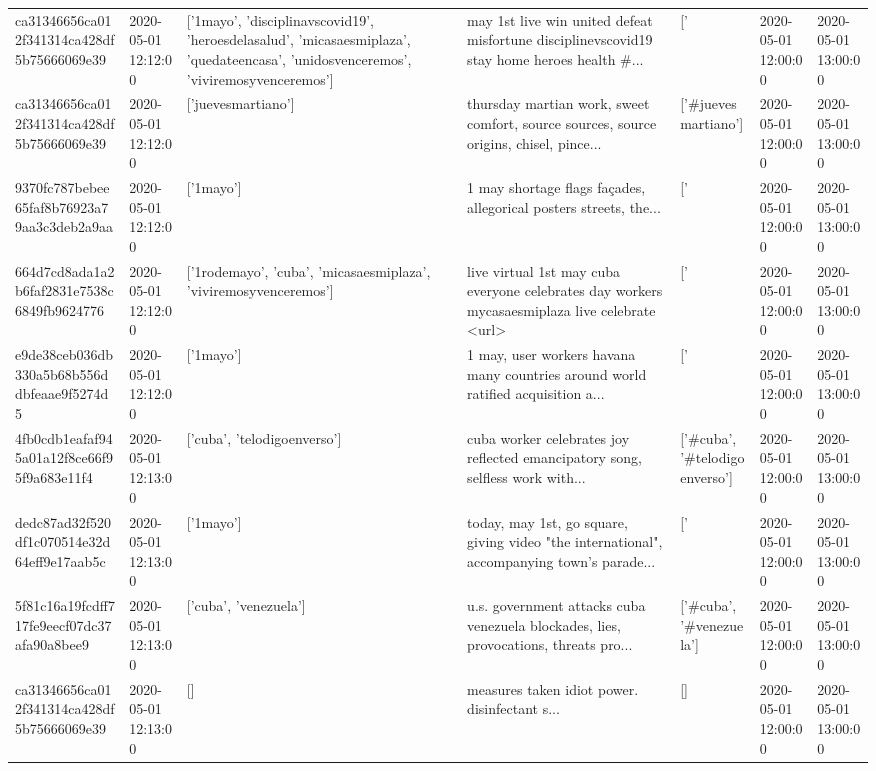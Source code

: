 \begin{tabular}{lllllll}
ca31346656ca012f341314ca428df5b75666069e39 & 2020-05-01 12:12:00 & ['1mayo', 'disciplinavscovid19', 'heroesdelasalud', 'micasaesmiplaza', 'quedateencasa', 'unidosvenceremos', 'viviremosyvenceremos'] & may 1st live win united defeat misfortune disciplinevscovid19 stay home heroes health \#... & ['#1mayo', '#heroesdelasalud', '#micasaesmiplaza', '#quedateencasa', '#unidosvenceremos', '#viviremosyvenceremos'] & 2020-05-01 12:00:00 & 2020-05-01 13:00:00 \\
ca31346656ca012f341314ca428df5b75666069e39 & 2020-05-01 12:12:00 & ['juevesmartiano'] & thursday martian work, sweet comfort, source sources, source origins, chisel, pince... & ['#juevesmartiano'] & 2020-05-01 12:00:00 & 2020-05-01 13:00:00 \\
9370fc787bebee65faf8b76923a79aa3c3deb2a9aa & 2020-05-01 12:12:00 & ['1mayo'] & 1 may shortage flags façades, allegorical posters streets, the... & ['#1mayo'] & 2020-05-01 12:00:00 & 2020-05-01 13:00:00 \\
664d7cd8ada1a2b6faf2831e7538c6849fb9624776 & 2020-05-01 12:12:00 & ['1rodemayo', 'cuba', 'micasaesmiplaza', 'viviremosyvenceremos'] & live virtual 1st may cuba everyone celebrates day workers mycasaesmiplaza live celebrate <url> & ['#1rodemayo', '#cuba', '#micasaesmiplaza', '#viviremosyvenceremos'] & 2020-05-01 12:00:00 & 2020-05-01 13:00:00 \\
e9de38ceb036db330a5b68b556ddbfeaae9f5274d5 & 2020-05-01 12:12:00 & ['1mayo'] & 1 may, user workers havana many countries around world ratified acquisition a... & ['#1mayo'] & 2020-05-01 12:00:00 & 2020-05-01 13:00:00 \\
4fb0cdb1eafaf945a01a12f8ce66f95f9a683e11f4 & 2020-05-01 12:13:00 & ['cuba', 'telodigoenverso'] & cuba worker celebrates joy reflected emancipatory song, selfless work with... & ['#cuba', '#telodigoenverso'] & 2020-05-01 12:00:00 & 2020-05-01 13:00:00 \\
dedc87ad32f520df1c070514e32d64eff9e17aab5c & 2020-05-01 12:13:00 & ['1mayo'] & today, may 1st, go square, giving video "the international", accompanying town's parade... & ['#1mayo'] & 2020-05-01 12:00:00 & 2020-05-01 13:00:00 \\
5f81c16a19fcdff717fe9eecf07dc37afa90a8bee9 & 2020-05-01 12:13:00 & ['cuba', 'venezuela'] & u.s. government attacks cuba venezuela blockades, lies, provocations, threats pro... & ['#cuba', '#venezuela'] & 2020-05-01 12:00:00 & 2020-05-01 13:00:00 \\
ca31346656ca012f341314ca428df5b75666069e39 & 2020-05-01 12:13:00 & [] & measures taken idiot power. disinfectant s... & [] & 2020-05-01 12:00:00 & 2020-05-01 13:00:00 \\

\end{tabular}
